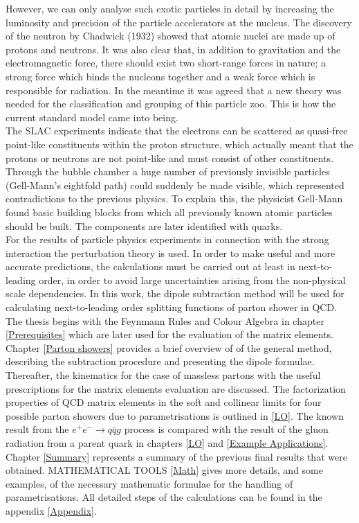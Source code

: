 However, we can only analyse such exotic particles in detail by increasing the luminosity and precision of the particle accelerators at the nucleus. 
The discovery of the neutron by Chadwick (1932) showed that atomic nuclei are made up of protons and neutrons. It was also clear that, in addition to gravitation and the electromagnetic force, there should exist two short-range forces in nature; a strong force which binds the nucleons together and a weak force which is responsible for radiation.
In the meantime it was agreed that a new theory was needed for the classification and grouping of this particle zoo. This is how the current standard model came into being.\\
The SLAC experiments indicate that the electrons can be scattered as quasi-free point-like constituents within the proton structure, which actually meant that the protons or neutrons are not point-like and must consist of other constituents. Through the bubble chamber a huge number of previously invisible particles (Gell-Mann's eightfold path) could suddenly be made visible, which represented contradictions to the previous physics. To explain this, the physicist Gell-Mann found basic building blocks from which all previously known atomic particles should be built. The components are later identified with quarks.\\
For the results of particle physics experiments in connection with the strong interaction the perturbation theory is used. In order to make useful and more accurate predictions, the calculations must be carried out at least in next-to-leading order, in order to avoid large uncertainties arising from the non-physical scale dependencies.   
In this work, the dipole subtraction method will be used for calculating next-to-leading order splitting functions of parton shower in QCD.\\
The thesis begins with the Feynmann Rules and Colour Algebra in chapter \ref{Prerequisites} which are later used for the evaluation of the matrix elements.
Chapter \ref{Parton showers} provides a brief overview of of the general method, describing the subtraction procedure and presenting the dipole formulae. Thereafter, the kinematics for the case of massless  partons with the useful prescriptions for the matrix elements evaluation are discussed. The factorization properties of QCD matrix elements in the soft and collinear limits for four possible parton showers due to parametrisations is outlined in \ref{LO}. The known result from the $ e^{+}e^{-} \rightarrow q \bar{q} g $ process is compared with the result of the gluon radiation from a parent quark in chapters \ref{LO} and \ref{Example Applications}. 
Chapter \ref{Summary} represents  a  summary  of  the  previous final results  that  were  obtained. MATHEMATICAL TOOLS \ref{Math} gives more details, and some examples, of the necessary mathematic formulae for the handling of parametrisations. All detailed steps of the calculations can be found in the appendix \ref{Appendix}.

 